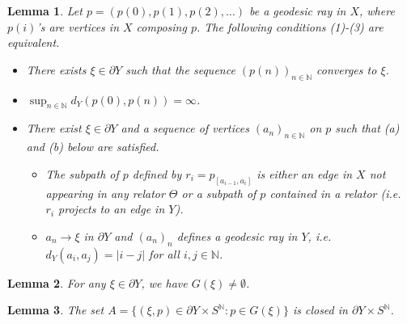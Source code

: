 \documentclass[10pt,a4paper]{amsart}
\newtheorem{lem}{Lemma}
\newcommand{\N}{\mathbb{N}}
\begin{document}
\begin{lem}\label{lem:geod ray converging in Y}
    Let $p=(p(0),p(1),p(2),\ldots)$ be a geodesic ray in $X$, where $p(i)$'s are vertices in $X$ composing $p$. The following conditions (1)-(3) are equivalent.
    \begin{itemize}
        \item[(1)]
        There exists $\xi \in \partial Y$ such that the sequence $(p(n))_{n \in \N}$ converges to $\xi$.
        \item[(2)]
        $\sup_{n \in \N}d_Y(p(0),p(n))= \infty$.
        \item[(3)] 
        There exist $\xi \in \partial Y$ and a sequence of vertices $(a_n)_{n \in \N}$ on $p$ such that (a) and (b) below are satisfied.
    
    \begin{itemize}
        \item[(a)] The subpath of $p$ defined by $r_i = p_{[a_{i-1}, a_i]}$ is either an edge in $X$ not appearing in any relator $\Theta$ or a subpath of $p$ contained in a relator (i.e.\ $r_i$ projects to an edge in $Y$).
        \item[(b)] $a_n \to \xi$ in $\partial Y$ and $(a_n)_n$ defines a geodesic ray in $Y$, i.e.\ $d_Y(a_i, a_j) = \vert i - j \vert$ for all $i,j \in \N$. %
    \end{itemize}
    \end{itemize}
\end{lem}

\begin{lem}
    \label{lemma: geodesic representatives for boundary}
    For any $\xi \in \partial Y$, we have $G(\xi) \neq \emptyset$.
    
\end{lem}

\begin{lem}
    \label{closed}
    The set $A = \{(\xi, p) \in \partial Y \times S^{\N}: p \in G(\xi)\}$ is closed in $\partial Y \times S^{\N}$.
\end{lem}
\end{document}

